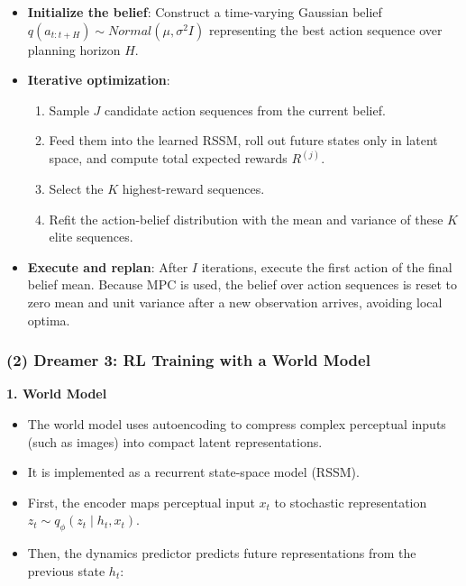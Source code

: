 \begin{itemize}
\tightlist
\item
  \textbf{Initialize the belief}: Construct a time-varying Gaussian belief \(q(a_{t:t+H}) \sim Normal(\mu, \sigma^2 I)\) representing the best action sequence over planning horizon \(H\).
\item
{}
  \textbf{Iterative optimization}:

  \begin{enumerate}
  \def\labelenumi{\arabic{enumi}.}
  \tightlist
  \item
    Sample \(J\) candidate action sequences from the current belief.
  \item
    Feed them into the learned RSSM, roll out future states only in latent space, and compute total expected rewards \(R^{(j)}\).
  \item
    Select the \(K\) highest-reward sequences.
  \item
    Refit the action-belief distribution with the mean and variance of these \(K\) elite sequences.
  \end{enumerate}
\item
  \textbf{Execute and replan}: After \(I\) iterations, execute the first action of the final belief mean. Because MPC is used, the belief over action sequences is reset to zero mean and unit variance after a new observation arrives, avoiding local optima.
\end{itemize}

\hypertarget{dreamer-3-rl-training-with-a-world-model}{%
\subsubsection{(2) Dreamer 3: RL Training with a World Model}\label{dreamer-3-rl-training-with-a-world-model}}

\textbf{1. World Model}

\begin{itemize}
\tightlist
\item
  The world model uses autoencoding to compress complex perceptual inputs (such as images) into compact latent representations.
\item
  It is implemented as a recurrent state-space model (RSSM).
\item
  First, the encoder maps perceptual input \(x_t\) to stochastic representation \(z_t \sim q_{\phi}(z_t \mid h_t, x_t)\).
\item
{}
  Then, the dynamics predictor predicts future representations from the previous state \(h_t\):
\end{itemize}

